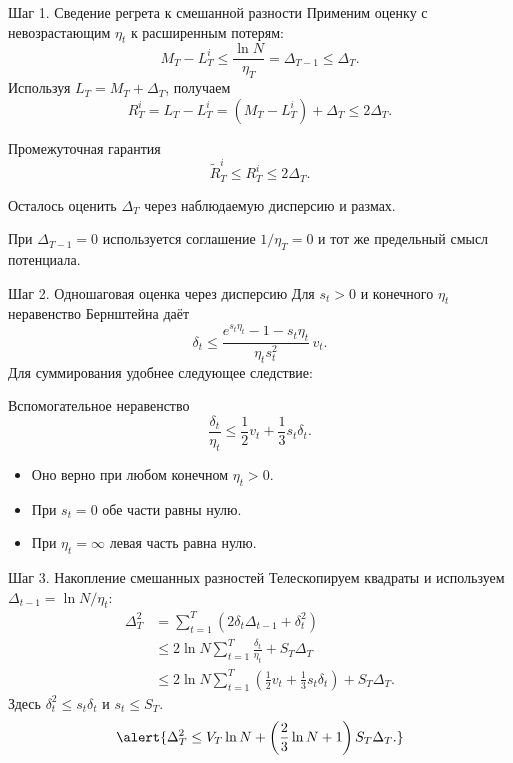 \documentclass[11pt,aspectratio=169]{beamer}
\begin{document}
\begin{frame}{Шаг 1. Сведение регрета к смешанной разности}
  Применим оценку с невозрастающим $\eta_t$ к расширенным потерям:
  \[
    M_T-L_T^i\le\frac{\ln N}{\eta_T}
      =\Delta_{T-1}\le\Delta_T.
  \]
  Используя $L_T=M_T+\Delta_T$, получаем
  \[
    R_T^i=L_T-L_T^i=(M_T-L_T^i)+\Delta_T\le2\Delta_T.
  \]
  \begin{block}{Промежуточная гарантия}
    \[\widetilde R_T^i\le R_T^i\le2\Delta_T.\]
  \end{block}
  Осталось оценить $\Delta_T$ через наблюдаемую дисперсию и размах.
  \par\vfill{\scriptsize При $\Delta_{T-1}=0$ используется соглашение $1/\eta_T=0$ и тот же предельный смысл потенциала.\par}
\end{frame}

\begin{frame}{Шаг 2. Одношаговая оценка через дисперсию}
  Для $s_t>0$ и конечного $\eta_t$ неравенство Бернштейна даёт
  \[
    \delta_t\le
    \frac{e^{s_t\eta_t}-1-s_t\eta_t}{\eta_t s_t^2}\,v_t.
  \]
  Для суммирования удобнее следующее следствие:
  \begin{block}{Вспомогательное неравенство}
    \[\frac{\delta_t}{\eta_t}\le\frac12v_t+\frac13s_t\delta_t.\]
  \end{block}
  \begin{itemize}
    \item Оно верно при любом конечном $\eta_t>0$.
    \item При $s_t=0$ обе части равны нулю.
    \item При $\eta_t=\infty$ левая часть равна нулю.
  \end{itemize}
\end{frame}

\begin{frame}{Шаг 3. Накопление смешанных разностей}
  Телескопируем квадраты и используем $\Delta_{t-1}=\ln N/\eta_t$:
  \begin{align*}
    \Delta_T^2
      &=\sum_{t=1}^T\left(2\delta_t\Delta_{t-1}+\delta_t^2\right)\\
      &\le2\ln N\sum_{t=1}^T\frac{\delta_t}{\eta_t}+S_T\Delta_T\\
      &\le2\ln N\sum_{t=1}^T\left(\frac12v_t+\frac13s_t\delta_t\right)
           +S_T\Delta_T.
  \end{align*}
  Здесь $\delta_t^2\le s_t\delta_t$ и $s_t\le S_T$.
  \[\alert{\Delta_T^2\le V_T\ln N+\left(\frac23\ln N+1\right)S_T\Delta_T.}\]
\end{frame}
\end{document}
